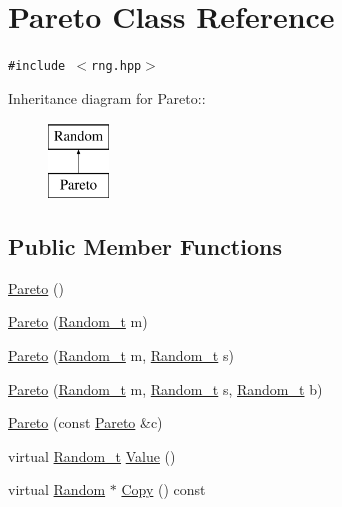 \hypertarget{classPareto}{
\section{Pareto Class Reference}
\label{classPareto}
}
{\tt \#include $<$rng.hpp$>$}

Inheritance diagram for Pareto::\begin{figure}[H]
\begin{center}
\leavevmode
\includegraphics[height=2cm]{classPareto}
\end{center}
\end{figure}
\subsection*{Public Member Functions}
\begin{CompactItemize}
\item 
\hyperlink{classPareto_a40fac27c6c9a7ba5ef782b4dda855e0}{Pareto} ()
\item 
\hyperlink{classPareto_5e162f7df6835da966ae4f59ec29c39d}{Pareto} (\hyperlink{rng_8hpp_ad41e7f5d86b1109b6a6a032c86cdd3f}{Random\_\-t} m)
\item 
\hyperlink{classPareto_efffb99c24a2e76a195a95b714d81d4d}{Pareto} (\hyperlink{rng_8hpp_ad41e7f5d86b1109b6a6a032c86cdd3f}{Random\_\-t} m, \hyperlink{rng_8hpp_ad41e7f5d86b1109b6a6a032c86cdd3f}{Random\_\-t} s)
\item 
\hyperlink{classPareto_0c0abd54c6ca85f9f74c217a629dd612}{Pareto} (\hyperlink{rng_8hpp_ad41e7f5d86b1109b6a6a032c86cdd3f}{Random\_\-t} m, \hyperlink{rng_8hpp_ad41e7f5d86b1109b6a6a032c86cdd3f}{Random\_\-t} s, \hyperlink{rng_8hpp_ad41e7f5d86b1109b6a6a032c86cdd3f}{Random\_\-t} b)
\item 
\hyperlink{classPareto_b22f1cbfb9a0ac6fe8a73c29dd397d15}{Pareto} (const \hyperlink{classPareto}{Pareto} \&c)
\item 
virtual \hyperlink{rng_8hpp_ad41e7f5d86b1109b6a6a032c86cdd3f}{Random\_\-t} \hyperlink{classPareto_c92998c5176de1ee80e64302ce2eec73}{Value} ()
\item 
virtual \hyperlink{classRandom}{Random} $\ast$ \hyperlink{classPareto_ec16a6e0b598846a9af58037ea5417d4}{Copy} () const 
\end{CompactItemize}


